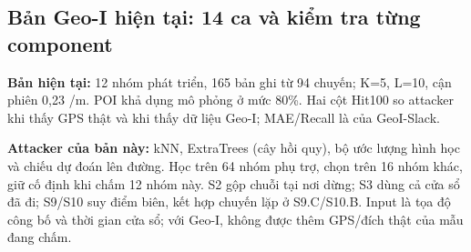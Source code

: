 \clearpage
\subsection{Bản Geo-I hiện tại: 14 ca và kiểm tra từng component}
\textbf{Bản hiện tại:} 12 nhóm phát triển, 165 bản ghi từ 94 chuyến; K=5, L=10, cận phiên 0,23 /m. POI khả dụng mô phỏng ở mức 80\%. Hai cột Hit100 so attacker khi thấy GPS thật và khi thấy dữ liệu Geo-I; MAE/Recall là của GeoI-Slack.

\textbf{Attacker của bản này:} kNN, ExtraTrees (cây hồi quy), bộ ước lượng hình học và chiếu dự đoán lên đường. Học trên 64 nhóm phụ trợ, chọn trên 16 nhóm khác, giữ cố định khi chấm 12 nhóm này. S2 gộp chuỗi tại nơi dừng; S3 dùng cả cửa sổ đã đi; S9/S10 suy điểm biên, kết hợp chuyến lặp ở S9.C/S10.B. Input là tọa độ công bố và thời gian cửa sổ; với Geo-I, không được thêm GPS/đích thật của mẫu đang chấm.

